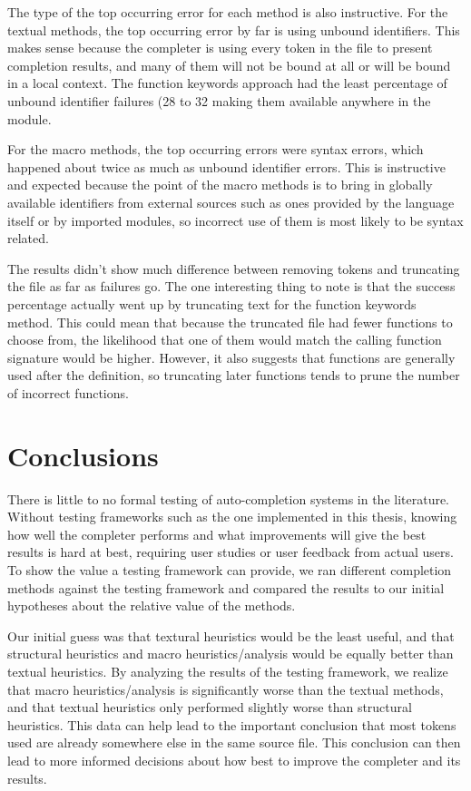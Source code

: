 \documentclass[ms,electronic,twosidetoc,letterpaper,chaptercenter,parttop,lol,lof,lot]{byumsphd}
\begin{document}
The type of the top occurring error for each method is also instructive. For the textual
methods, the top occurring error by far is using unbound identifiers. This makes sense
because the completer is using every token in the file to present completion results, and
many of them will not be bound at all or will be bound in a local context. The function
keywords approach had the least percentage of unbound identifier failures (28%
to 32%
making them available anywhere in the module.

For the macro methods, the top occurring errors were syntax errors, which happened about
twice as much as unbound identifier errors. This is instructive and expected because the
point of the macro methods is to bring in globally available identifiers from external
sources such as ones provided by the language itself or by imported modules, so incorrect
use of them is most likely to be syntax related.

The results didn't show much difference between removing tokens and truncating the file as
far as failures go. The one interesting thing to note is that the success percentage
actually went up by truncating text for the function keywords method. This could mean that
because the truncated file had fewer functions to choose from, the likelihood that one of
them would match the calling function signature would be higher. However, it also suggests
that functions are generally used after the definition, so truncating later functions
tends to prune the number of incorrect functions.

\chapter{Conclusions}

There is little to no formal testing of auto-completion systems in the literature. Without
testing frameworks such as the one implemented in this thesis, knowing how well the
completer performs and what improvements will give the best results is hard at best,
requiring user studies or user feedback from actual users. To show the value a testing
framework can provide, we ran different completion methods against the testing framework
and compared the results to our initial hypotheses about the relative value of the
methods.

Our initial guess was that textural heuristics would be the least useful, and that
structural heuristics and macro heuristics/analysis would be equally better than textual
heuristics. By analyzing the results of the testing framework, we realize that macro
heuristics/analysis is significantly worse than the textual methods, and that textual
heuristics only performed slightly worse than structural heuristics. This data can help
lead to the important conclusion that most tokens used are already somewhere else in the
same source file. This conclusion can then lead to more informed decisions about how best
to improve the completer and its results.
\end{document}
